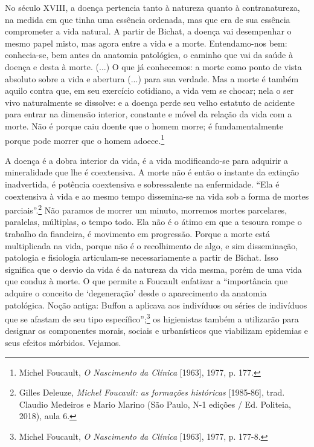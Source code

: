 No século XVIII, a doença pertencia tanto à natureza quanto à
contranatureza, na medida em que tinha uma essência ordenada, mas que
era de sua essência comprometer a vida natural. A partir de Bichat, a
doença vai desempenhar o mesmo papel misto, mas agora entre a vida e a
morte. Entendamo-nos bem: conhecia-se, bem antes da anatomia patológica,
o caminho que vai da saúde à doença e desta à morte. (...) O que já
conhecemos: a morte como ponto de vista absoluto sobre a vida e abertura
(...) para sua verdade. Mas a morte é também aquilo contra que, em seu
exercício cotidiano, a vida vem se chocar; nela o ser vivo naturalmente
se dissolve: e a doença perde seu velho estatuto de acidente para entrar
na dimensão interior, constante e móvel da relação da vida com a morte.
Não é porque caiu doente que o homem morre; é fundamentalmente porque
pode morrer que o homem adoece.\footnote{Michel Foucault, \emph{O
  Nascimento da Clínica} {[}1963{]}, 1977, p. 177.}

A doença é a dobra interior da vida, é a vida modificando-se para
adquirir a mineralidade que lhe é coextensiva. A morte não é então o
instante da extinção inadvertida, é potência coextensiva e sobressalente
na enfermidade. ``Ela é coextensiva à vida e ao mesmo tempo dissemina-se
na vida sob a forma de mortes parciais''.\footnote{Gilles Deleuze,
  \emph{Michel Foucault: as formações históricas} {[}1985-86{]}, trad.
  Claudio Medeiros e Mario Marino (São Paulo, N-1 edições / Ed.
  Politeia, 2018), aula 6.} Não paramos de morrer um minuto, morremos
mortes parcelares, paralelas, múltiplas, o tempo todo. Ela não é o átimo
em que a tesoura rompe o trabalho da fiandeira, é movimento em
progressão. Porque a morte está multiplicada na vida, porque não é o
recolhimento de algo, e sim disseminação, patologia e fisiologia
articulam-se necessariamente a partir de Bichat. Isso significa que o
desvio da vida é da natureza da vida mesma, porém de uma vida que conduz
à morte. O que permite a Foucault enfatizar a ``importância que adquire
o conceito de `degeneração' desde o aparecimento da anatomia patológica.
Noção antiga: Buffon a aplicava aos indivíduos ou séries de indivíduos
que se afastam de seu tipo específico'';\footnote{Michel Foucault,
  \emph{O Nascimento da Clínica} {[}1963{]}, 1977, p. 177-8.} os
higienistas também a utilizarão para designar os componentes morais,
sociais e urbanísticos que viabilizam epidemias e seus efeitos mórbidos.
Vejamos.

